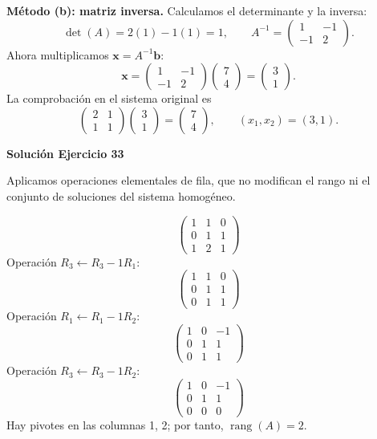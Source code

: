 \documentclass[12pt]{article}
\theoremstyle{remark}
\newcommand{\rang}{\operatorname{rang}}
\newcommand{\vect}[1]{\boldsymbol{#1}}
\begin{document}
\textbf{Método (b): matriz inversa.} Calculamos el determinante y la inversa:
\[
\det(A)=2(1)-1(1)=1,\qquad A^{-1}=\begin{pmatrix}1&-1\\-1&2\end{pmatrix}.
\]
Ahora multiplicamos $\vect x=A^{-1}\vect b$:
\[
\vect x=\begin{pmatrix}1&-1\\-1&2\end{pmatrix}\begin{pmatrix}7\\4\end{pmatrix}=\begin{pmatrix}3\\1\end{pmatrix}.
\]
La comprobación en el sistema original es
\[
\begin{pmatrix}2&1\\1&1\end{pmatrix}\begin{pmatrix}3\\1\end{pmatrix}=\begin{pmatrix}7\\4\end{pmatrix},\qquad\boxed{(x_1,x_2)=(3,1)}.
\]

\par\bigskip\noindent\textbf{Solución Ejercicio 33}\par\nobreak
Aplicamos operaciones elementales de fila, que no modifican el rango ni el conjunto de soluciones del sistema homogéneo.

\[
\begin{pmatrix}1&1&0\\0&1&1\\1&2&1\end{pmatrix}
\]
Operación $R_{3}\leftarrow R_{3}-1R_{1}$:
\[
\begin{pmatrix}1&1&0\\0&1&1\\0&1&1\end{pmatrix}
\]
Operación $R_{1}\leftarrow R_{1}-1R_{2}$:
\[
\begin{pmatrix}1&0&-1\\0&1&1\\0&1&1\end{pmatrix}
\]
Operación $R_{3}\leftarrow R_{3}-1R_{2}$:
\[
\begin{pmatrix}1&0&-1\\0&1&1\\0&0&0\end{pmatrix}
\]
Hay pivotes en las columnas 1, 2; por tanto, $\boxed{\rang(A)=2}$.
\end{document}
